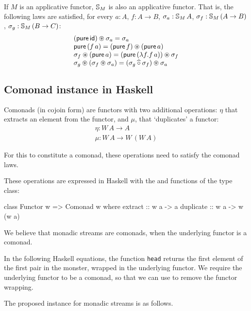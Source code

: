 \begin{conjecture}\label{lemma:appl_laws}
If $M$ is an applicative functor, $\mathbb{S}_{M}$ is also an applicative functor.
That is, the following laws are satisfied, for every $a:A$, $f:A\rightarrow B$, $\sigma_a:\mathbb{S}_{M}\,A$, $\sigma_f : \mathbb{S}_{M}\,(A\rightarrow B)$, $\sigma_g: \mathbb{S}_{M}\,(B\rightarrow C)$:
$$
\begin{array}{l}
(\mathsf{pure}\,\mathsf{id}) \circledast \sigma_a = \sigma_a \\
\mathsf{pure}\,(f\,a) = (\mathsf{pure}\,f) \circledast (\mathsf{pure}\,a) \\
\sigma_f \circledast (\mathsf{pure}\,a) = (\mathsf{pure}\,(\lambda f. f\,a)) \circledast \sigma_f \\
\sigma_g \circledast (\sigma_f \circledast \sigma_a) = (\sigma_g \mathbin{\widehat{\circ}} \sigma_f) \circledast \sigma_a
\end{array}
$$
\end{conjecture}

\subsection{Comonad instance in Haskell}

Comonads (in cojoin form) are functors with two additional operations: $\eta$ that extracts an element from the functor, and $\mu$, that `duplicates' a functor:
$$
\begin{array}{l}
\eta : W\,A \to A\\
\mu : W\,A \to W\,(W\,A)
\end{array}
$$

For this to constitute a comonad, these operations need to satisfy the comonad laws.

These operations are expressed in Haskell with the  and  functions of the  type class:

\begin{haskell}
class Functor w => Comonad w where
  extract :: w a -> a
  duplicate :: w a -> w (w a)
\end{haskell}

We believe that monadic streams are comonads, when the underlying functor is a comonad.

In the following Haskell equations, the function \verb+head+ returns the first element of the first pair in the monster, wrapped in the underlying functor. We require the underlying functor to be a comonad, so that we can use  to remove the functor wrapping.

The proposed  instance for monadic streams is as follows.

